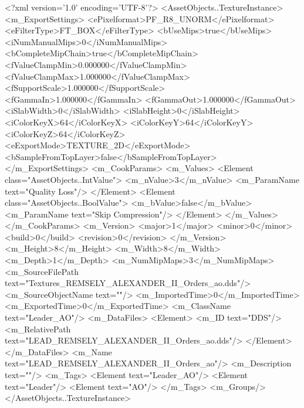 <?xml version='1.0' encoding='UTF-8'?>
<AssetObjects..TextureInstance>
  <m_ExportSettings>
    <ePixelformat>PF_R8_UNORM</ePixelformat>
    <eFilterType>FT_BOX</eFilterType>
    <bUseMips>true</bUseMips>
    <iNumManualMips>0</iNumManualMips>
    <bCompleteMipChain>true</bCompleteMipChain>
    <fValueClampMin>0.000000</fValueClampMin>
    <fValueClampMax>1.000000</fValueClampMax>
    <fSupportScale>1.000000</fSupportScale>
    <fGammaIn>1.000000</fGammaIn>
    <fGammaOut>1.000000</fGammaOut>
    <iSlabWidth>0</iSlabWidth>
    <iSlabHeight>0</iSlabHeight>
    <iColorKeyX>64</iColorKeyX>
    <iColorKeyY>64</iColorKeyY>
    <iColorKeyZ>64</iColorKeyZ>
    <eExportMode>TEXTURE_2D</eExportMode>
    <bSampleFromTopLayer>false</bSampleFromTopLayer>
  </m_ExportSettings>
  <m_CookParams>
    <m_Values>
      <Element class="AssetObjects..IntValue">
        <m_nValue>3</m_nValue>
        <m_ParamName text="Quality Loss"/>
      </Element>
      <Element class="AssetObjects..BoolValue">
        <m_bValue>false</m_bValue>
        <m_ParamName text="Skip Compression"/>
      </Element>
    </m_Values>
  </m_CookParams>
  <m_Version>
    <major>1</major>
    <minor>0</minor>
    <build>0</build>
    <revision>0</revision>
  </m_Version>
  <m_Height>8</m_Height>
  <m_Width>8</m_Width>
  <m_Depth>1</m_Depth>
  <m_NumMipMaps>3</m_NumMipMaps>
  <m_SourceFilePath text="Textures\LEAD_REMSELY_ALEXANDER_II_Orders_ao.dds"/>
  <m_SourceObjectName text=""/>
  <m_ImportedTime>0</m_ImportedTime>
  <m_ExportedTime>0</m_ExportedTime>
  <m_ClassName text="Leader_AO"/>
  <m_DataFiles>
    <Element>
      <m_ID text="DDS"/>
      <m_RelativePath text="LEAD_REMSELY_ALEXANDER_II_Orders_ao.dds"/>
    </Element>
  </m_DataFiles>
  <m_Name text="LEAD_REMSELY_ALEXANDER_II_Orders_ao"/>
  <m_Description text=""/>
  <m_Tags>
    <Element text="Leader_AO"/>
    <Element text="Leader"/>
    <Element text="AO"/>
  </m_Tags>
  <m_Groups/>
</AssetObjects..TextureInstance>
